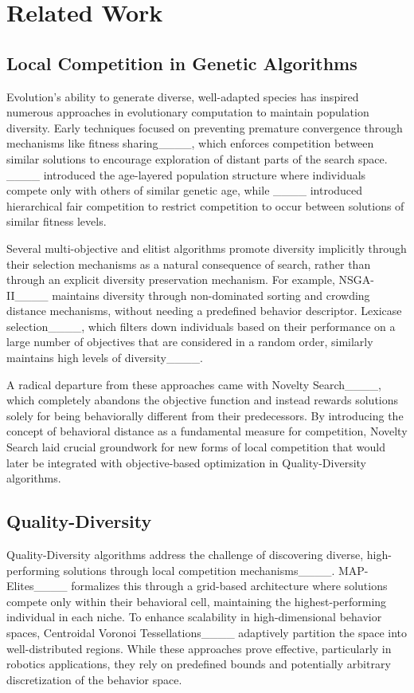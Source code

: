 \section{Related Work}
\label{sec:related-work}
\subsection{Local Competition in Genetic Algorithms}
%
Evolution's ability to generate diverse, well-adapted species has inspired numerous approaches in evolutionary computation to maintain population diversity. Early techniques focused on preventing premature convergence through mechanisms like fitness sharing____, which enforces competition between similar solutions to encourage exploration of distant parts of the search space. ____ introduced the age-layered population structure where individuals compete only with others of similar genetic age, while ____ introduced hierarchical fair competition to restrict competition to occur between solutions of similar fitness levels.

Several multi-objective and elitist algorithms promote diversity implicitly through their selection mechanisms as a natural consequence of search, rather than through an explicit diversity preservation mechanism. For example, NSGA-II____ maintains diversity through non-dominated sorting and crowding distance mechanisms, without needing a predefined behavior descriptor. Lexicase selection____, which filters down individuals based on their performance on a large number of objectives that are considered in a random order, similarly maintains high levels of diversity____.

A radical departure from these approaches came with Novelty Search____, which completely abandons the objective function and instead rewards solutions solely for being behaviorally different from their predecessors. By introducing the concept of behavioral distance as a fundamental measure for competition, Novelty Search laid crucial groundwork for new forms of local competition that would later be integrated with objective-based optimization in Quality-Diversity algorithms. 

\subsection{Quality-Diversity}
%
Quality-Diversity algorithms address the challenge of discovering diverse, high-performing solutions through local competition mechanisms____. MAP-Elites____ formalizes this through a grid-based architecture where solutions compete only within their behavioral cell, maintaining the highest-performing individual in each niche. To enhance scalability in high-dimensional behavior spaces, Centroidal Voronoi Tessellations____ adaptively partition the space into well-distributed regions. While these approaches prove effective, particularly in robotics applications, they rely on predefined bounds and potentially arbitrary discretization of the behavior space.

